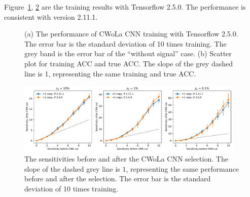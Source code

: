 \documentclass[12pt]{article}
\begin{document}
            Figure~\ref{fig:cwola_cnn_training_performance_copy_1_tf_250}, \ref{fig:sensitivity_improvement_bkg_eff_tf_250} are the training results with Tensorflow 2.5.0. The performance is consistent with version 2.11.1.
            \begin{figure}[htpb]
                \centering
                \caption{(a) The performance of CWoLa CNN training with Tensorflow 2.5.0. The error bar is the standard deviation of 10 times training. The grey band is the error bar of the ``without signal'' case. (b) Scatter plot for training ACC and true ACC. The slope of the grey dashed line is 1, representing the same training and true ACC.}
                \label{fig:cwola_cnn_training_performance_copy_1_tf_250}
            \end{figure}

            \begin{figure}[htpb]
                \centering
                \includegraphics[width=0.97\textwidth]{HVmodel_sensitivity_improvement_bkg_eff_copy_1_tf_250.pdf}
                \caption{The sensitivities before and after the CWoLa CNN selection. The slope of the dashed grey line is $1$, representing the same performance before and after the selection. The error bar is the standard deviation of 10 times training.}
                \label{fig:sensitivity_improvement_bkg_eff_tf_250}
            \end{figure} 
\end{document}
